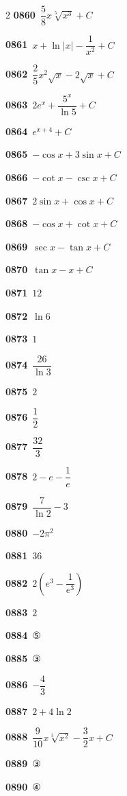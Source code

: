 \documentclass[10pt,a4paper]{article}
\begin{document}
\begin{multicols}{2}
\noindent\textbf{0860}\ $\dfrac{5}{8}x\sqrt[5]{x^3}+C$\par
\noindent\textbf{0861}\ $x+\ln|x|-\dfrac{1}{x^2}+C$\par
\noindent\textbf{0862}\ $\dfrac{2}{5}x^2\sqrt{x}-2\sqrt{x}+C$\par
\noindent\textbf{0863}\ $2e^x+\dfrac{5^x}{\ln 5}+C$\par
\noindent\textbf{0864}\ $e^{x+4}+C$\par
\noindent\textbf{0865}\ $-\cos x+3\sin x+C$\par
\noindent\textbf{0866}\ $-\cot x-\csc x+C$\par
\noindent\textbf{0867}\ $2\sin x+\cos x+C$\par
\noindent\textbf{0868}\ $-\cos x+\cot x+C$\par
\noindent\textbf{0869}\ $\sec x-\tan x+C$\par
\noindent\textbf{0870}\ $\tan x-x+C$\par
\noindent\textbf{0871}\ $12$\par
\noindent\textbf{0872}\ $\ln 6$\par
\noindent\textbf{0873}\ $1$\par
\noindent\textbf{0874}\ $\dfrac{26}{\ln 3}$\par
\noindent\textbf{0875}\ $2$\par
\noindent\textbf{0876}\ $\dfrac{1}{2}$\par
\noindent\textbf{0877}\ $\dfrac{32}{3}$\par
\noindent\textbf{0878}\ $2-e-\dfrac{1}{e}$\par
\noindent\textbf{0879}\ $\dfrac{7}{\ln 2}-3$\par
\noindent\textbf{0880}\ $-2\pi^2$\par
\noindent\textbf{0881}\ $36$\par
\noindent\textbf{0882}\ $2\left(e^3-\dfrac{1}{e^3}\right)$\par
\noindent\textbf{0883}\ $2$\par
\noindent\textbf{0884}\ ⑤\par
\noindent\textbf{0885}\ ③\par
\noindent\textbf{0886}\ $-\dfrac{4}{3}$\par
\noindent\textbf{0887}\ $2+4\ln 2$\par
\noindent\textbf{0888}\ $\dfrac{9}{10}x\sqrt[3]{x^2}-\dfrac{3}{2}x+C$\par
\noindent\textbf{0889}\ ③\par
\noindent\textbf{0890}\ ④\par

\end{multicols}
\end{document}

